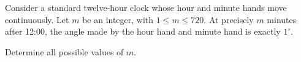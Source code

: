 Consider a standard twelve-hour clock whose hour and minute hands move continuously. Let $m$ be an integer, with $1 \leq m \leq 720$. At precisely $m$ minutes after 12:00, the angle made by the hour hand and minute hand is exactly $1^\circ$.

Determine all possible values of $m$.